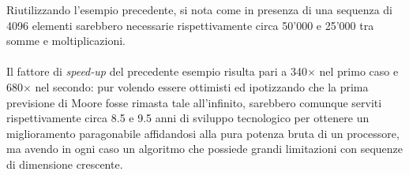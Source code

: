 Riutilizzando l'esempio precedente, si nota come in presenza di una sequenza di 
4096 elementi sarebbero necessarie rispettivamente circa 50'000 e 25'000 tra
somme e moltiplicazioni. 
\\ \\
Il fattore di \emph{speed-up} del precedente esempio risulta pari a 340$\times$
nel primo caso e 680$\times$ nel secondo: pur volendo essere ottimisti ed 
ipotizzando che la prima previsione di Moore fosse rimasta tale all'infinito, 
sarebbero comunque serviti rispettivamente circa 8.5 e 9.5 anni di sviluppo 
tecnologico per ottenere un miglioramento paragonabile affidandosi alla pura 
potenza bruta di un processore, ma avendo in ogni caso un algoritmo che possiede
grandi limitazioni con sequenze di dimensione crescente.